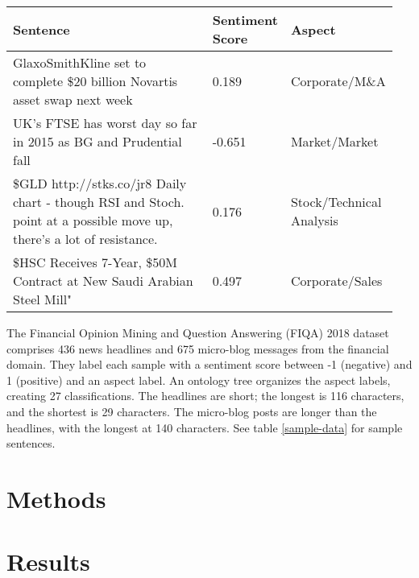 \documentclass[11pt,a4paper,titlepage]{article}
\begin{document}
\renewcommand{\arraystretch}{1.5}
\begin{table*}
  \small
  \caption{Sample FIQA 2018 Data}
  \label{sample-data}
  \centering
  \begin{tabular}{p{0.65\linewidth} | p{0.09\linewidth} | p{0.21\linewidth}}
    \toprule
    Sentence     & Sentiment Score     & Aspect \\
    \midrule
    GlaxoSmithKline set to complete \$20 billion Novartis asset swap next week                                                 & 0.189  & Corporate/M\&A           \\
    UK's FTSE has worst day so far in 2015 as BG and Prudential fall                                                           & -0.651 & Market/Market            \\
    \$GLD http://stks.co/jr8 Daily chart - though RSI and Stoch. point at a possible move up, there's a lot of resistance.     & 0.176  & Stock/Technical Analysis \\
    \$HSC Receives 7-Year, \$50M Contract at New Saudi Arabian Steel Mill"                                                     & 0.497  & Corporate/Sales          \\
    \bottomrule
  \end{tabular}
\end{table*}

The Financial Opinion Mining and Question Answering (FIQA) 2018 dataset \citep{10.1145/3184558.3192301} comprises 436 news headlines and 675 micro-blog messages from the financial domain. They label each sample with a sentiment score between -1 (negative) and 1 (positive) and an aspect label. An ontology tree organizes the aspect labels, creating 27 classifications. The headlines are short; the longest is 116 characters, and the shortest is 29 characters. The micro-blog posts are longer than the headlines, with the longest at 140 characters. See table \ref{sample-data} for sample sentences.

\section{Methods}



\section{Results}
\end{document}
